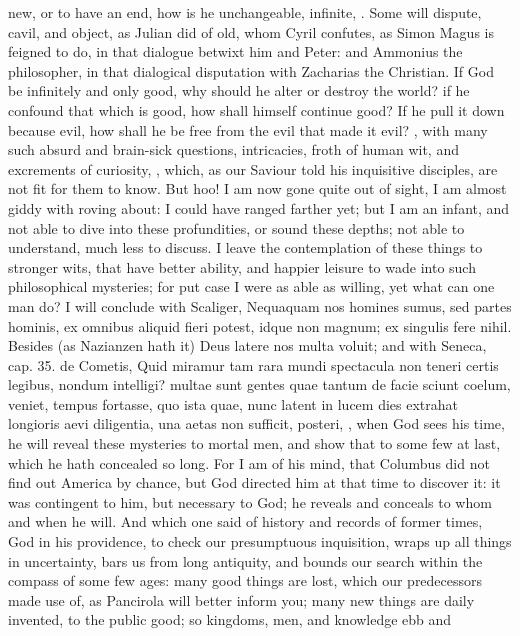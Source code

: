{new, or to have an end, how is he unchangeable, infinite, \etc{}. Some will
dispute, cavil, and object, as Julian did of old, whom Cyril confutes,
as Simon Magus is feigned to do, in that dialogue betwixt him and
Peter: and Ammonius the philosopher, in that dialogical disputation
with Zacharias the Christian. If God be infinitely and only good, why
should he alter or destroy the world? if he confound that which is
good, how shall himself continue good? If he pull it down because evil,
how shall he be free from the evil that made it evil? \etc{}, with many
such absurd and brain-sick questions, intricacies, froth of human wit,
and excrements of curiosity, \etc{}, which, as our Saviour told his
inquisitive disciples, are not fit for them to know. But hoo! I am now
gone quite out of sight, I am almost giddy with roving about: I could
have ranged farther yet; but I am an infant, and not able to dive
into these profundities, or sound these depths; not able to understand,
much less to discuss. I leave the contemplation of these things to
stronger wits, that have better ability, and happier leisure to wade
into such philosophical mysteries; for put case I were as able as
willing, yet what can one man do? I will conclude with Scaliger,
Nequaquam nos homines sumus, sed partes hominis, ex omnibus aliquid
fieri potest, idque non magnum; ex singulis fere nihil. Besides (as
Nazianzen hath it) Deus latere nos multa voluit; and with Seneca, cap.
35. de Cometis, Quid miramur tam rara mundi spectacula non teneri
certis legibus, nondum intelligi? multae sunt gentes quae tantum de
facie sciunt coelum, veniet, tempus fortasse, quo ista quae, nunc
latent in lucem dies extrahat longioris aevi diligentia, una aetas non
sufficit, posteri, \etc{}, when God sees his time, he will reveal these
mysteries to mortal men, and show that to some few at last, which he
hath concealed so long. For I am of his mind, that Columbus did
not find out America by chance, but God directed him at that time to
discover it: it was contingent to him, but necessary to God; he reveals
and conceals to whom and when he will. And which one said of
history and records of former times, God in his providence, to check
our presumptuous inquisition, wraps up all things in uncertainty, bars
us from long antiquity, and bounds our search within the compass of
some few ages: many good things are lost, which our predecessors made
use of, as Pancirola will better inform you; many new things are daily
invented, to the public good; so kingdoms, men, and knowledge ebb and
}
